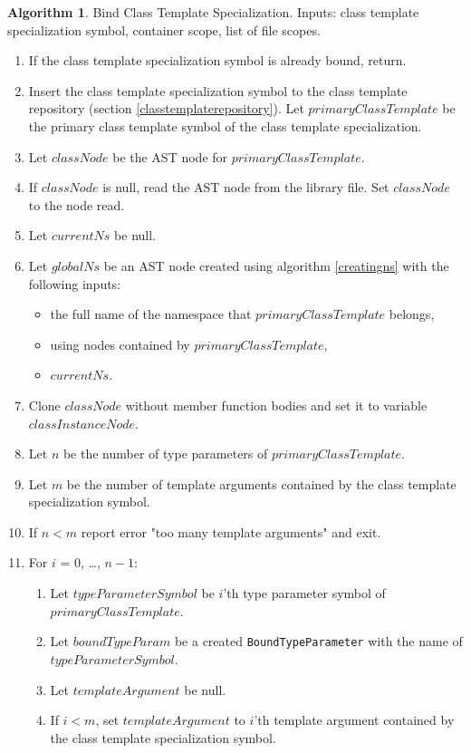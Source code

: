 \documentclass[a4paper,oneside,11pt]{book}
\theoremstyle{definition}
\newtheorem{algo}{Algorithm}[section]
\begin{document}
\begin{algo}\label{bindtemplatetypesymbol} Bind Class Template Specialization. Inputs: class template specialization symbol, container scope, list of file scopes.
\begin{enumerate}
\item
If the class template specialization symbol is already bound, return.
\item
Insert the class template specialization symbol to the class template repository (section \ref{classtemplaterepository}).
Let $primaryClassTemplate$ be the primary class template symbol of the class template specialization.
\item
Let $classNode$ be the AST node for $primaryClassTemplate$.
\item
If $classNode$ is null, read the AST node from the library file. Set $classNode$ to the node read.
\item
Let $currentNs$ be null.
\item
Let $globalNs$ be an AST node created using algorithm \ref{creatingns} with the following inputs:
\begin{itemize}
\item
the full name of the namespace that $primaryClassTemplate$ belongs,
\item
using nodes contained by $primaryClassTemplate$,
\item
$currentNs$.
\end{itemize}
\item
Clone $classNode$ without member function bodies and set it to variable $classInstanceNode$.
\item
Let $n$ be the number of type parameters of $primaryClassTemplate$.
\item
Let $m$ be the number of template arguments contained by the class template specialization symbol.
\item
If $n < m$ report error "too many template arguments" and exit.
\item
For $i$ = 0, \ldots, $n - 1$:
\begin{enumerate}
\item
Let $typeParameterSymbol$ be $i$'th type parameter symbol of $primaryClassTemplate$.
\item
Let $boundTypeParam$ be a created \verb|BoundTypeParameter| with the name of\\
$typeParameterSymbol$.
\item
Let $templateArgument$ be null.
\item
If $i < m$, set $templateArgument$ to $i$'th template argument contained by the class template specialization symbol.

\end{enumerate}
\end{enumerate}
\end{algo}
\end{document}
